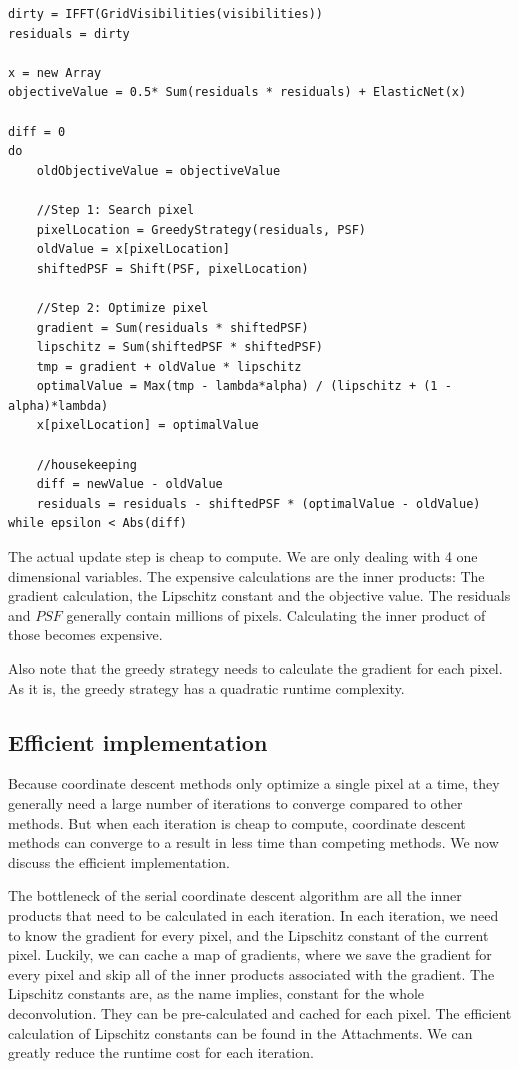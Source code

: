 \begin{lstlisting}
dirty = IFFT(GridVisibilities(visibilities))
residuals = dirty

x = new Array
objectiveValue = 0.5* Sum(residuals * residuals) + ElasticNet(x)

diff = 0
do 
	oldObjectiveValue = objectiveValue
	
	//Step 1: Search pixel
	pixelLocation = GreedyStrategy(residuals, PSF)
	oldValue = x[pixelLocation]
	shiftedPSF = Shift(PSF, pixelLocation)
	
	//Step 2: Optimize pixel
	gradient = Sum(residuals * shiftedPSF)
	lipschitz = Sum(shiftedPSF * shiftedPSF)
	tmp = gradient + oldValue * lipschitz 
	optimalValue = Max(tmp - lambda*alpha) / (lipschitz + (1 - alpha)*lambda)
	x[pixelLocation] = optimalValue

	//housekeeping
	diff = newValue - oldValue
	residuals = residuals - shiftedPSF * (optimalValue - oldValue)
while epsilon < Abs(diff) 
\end{lstlisting}

The actual update step is cheap to compute. We are only dealing with 4 one dimensional variables. The expensive calculations are the inner products: The gradient calculation, the Lipschitz constant and the objective value. The residuals and $PSF$ generally contain millions of pixels. Calculating the inner product of those becomes expensive. 

Also note that the greedy strategy needs to calculate the gradient for each pixel. As it is, the greedy strategy has a quadratic runtime complexity. 

\subsection{Efficient implementation}\label{cd:efficient}
Because coordinate descent methods only optimize a single pixel at a time, they generally need a large number of iterations to converge compared to other methods. But when each iteration is cheap to compute, coordinate descent methods can converge to a result in less time than competing methods\cite{nesterov2012efficiency, nesterov2013gradient}. We now discuss the efficient implementation.

The bottleneck of the serial coordinate descent algorithm are all the inner products that need to be calculated in each iteration. In each iteration, we need to know the gradient for every pixel, and the Lipschitz constant of the current pixel. Luckily, we can cache a map of gradients, where we save the gradient for every pixel and skip all of the inner products associated with the gradient. The Lipschitz constants are, as the name implies, constant for the whole deconvolution. They can be pre-calculated and cached for each pixel. The efficient calculation of Lipschitz constants can be found in the Attachments. We can greatly reduce the runtime cost for each iteration.


